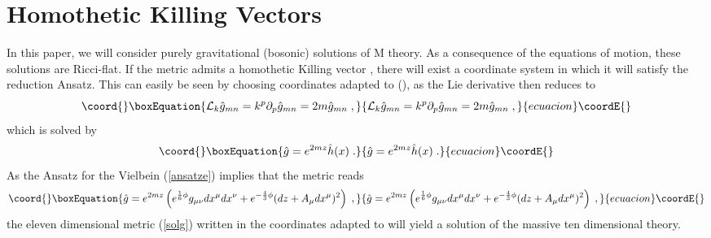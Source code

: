 \documentclass[a4paper,12pt]{article}
\begin{document}
\section{Homothetic Killing Vectors}\label{homothetic}
In this paper, we will consider purely gravitational (bosonic) solutions of M theory. As a consequence of the equations of motion, these solutions are Ricci-flat.
If the metric admits a homothetic Killing vector \coordHE{}, there will exist a coordinate system in which it will satisfy the reduction Ansatz. This can easily be seen by choosing coordinates adapted to \coordHE{} (\coordHE{}), as the Lie derivative then reduces to
\begin{equation}\coord{}\boxEquation{
\mathcal{L}_k \hat{g}_{mn}=k^p \partial_p \hat{g}_{mn}=2m\hat{g}_{mn}\; ,
}{
\mathcal{L}_k \hat{g}_{mn}=k^p \partial_p \hat{g}_{mn}=2m\hat{g}_{mn}\; ,
}{ecuacion}\coordE{}\end{equation}
which is solved by
\begin{equation}\coord{}\boxEquation{\label{solg}
\hat{g}=e^{2m z} \hat{h}(x)\; .
}{\hat{g}=e^{2m z} \hat{h}(x)\; .
}{ecuacion}\coordE{}\end{equation}
As the Ansatz for the Vielbein (\ref{ansatze}) implies that the metric reads
\begin{equation}\coord{}\boxEquation{ \label{ansatzg}
\hat{g}=e^{2mz}\left( e^{\frac16 \phi} g_{\mu \nu}dx^\mu dx^\nu+e^{-\frac43 \phi}(dz+A_\mu dx^\mu)^2 \right)\; ,
}{ \hat{g}=e^{2mz}\left( e^{\frac16 \phi} g_{\mu \nu}dx^\mu dx^\nu+e^{-\frac43 \phi}(dz+A_\mu dx^\mu)^2 \right)\; ,
}{ecuacion}\coordE{}\end{equation}
the eleven dimensional metric (\ref{solg}) written in the coordinates adapted to \coordHE{} will yield a solution of the massive ten dimensional theory.
\end{document}

